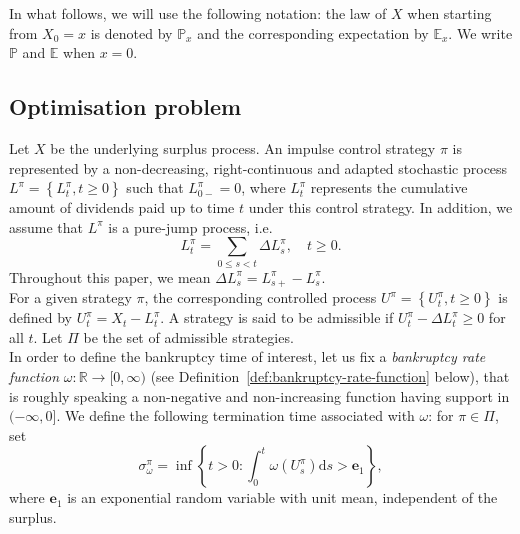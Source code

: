 \documentclass[10pt,a4paper]{amsart}
\newcommand{\p}{\mathbb{P}}
\newcommand{\e}{\mathbb{E}}
\newcommand{\reals}{\mathbb{R}}
\newcommand{\ruintime}{\sigma^\pi_\omega}
\renewcommand{\leq}{\leqslant}
\renewcommand{\geq}{\geqslant}
\begin{document}
In what follows, we will use the following notation: the law of $X$ when starting from $X_0 = x$ is denoted by $\p_x$ and the corresponding expectation by $\e_x$. We write $\p$ and $\e$ when $x=0$.


\subsection{Optimisation problem}\label{sect:optimisation-problem}

Let $X$ be the underlying surplus process. An impulse control strategy $\pi$ is represented by a non-decreasing, right-continuous and adapted stochastic process $L^\pi = \left\lbrace L^\pi_t , t \geq 0 \right\rbrace$ such that $L^\pi_{0-} = 0$, where $L^\pi_t$ represents the cumulative amount of dividends paid up to time $t$ under this control strategy. In addition, we assume that $L^\pi$ is a pure-jump process, i.e.
\[
L^\pi_t = \sum_{0 \leq s < t} \Delta L^\pi_s, \quad t \geq 0.
\]
Throughout this paper, we mean $\Delta L^\pi_s = L^\pi_{s+} - L^\pi_s$.\\
For a given strategy $\pi$, the corresponding controlled process $U^\pi = \left\lbrace U^\pi_t , t \geq 0 \right\rbrace$ is defined by $U^\pi_t = X_t - L^\pi_t$. A strategy is said to be admissible if $U^\pi_t - \Delta L^\pi_t \geq 0$ for all $t$. Let $\Pi$ be the set of admissible strategies.\\
In order to define the bankruptcy time of interest, let us fix a \textit{bankruptcy rate function} $\omega \colon \reals \to [0,\infty)$ (see Definition~\ref{def:bankruptcy-rate-function} below), that is roughly speaking a non-negative and non-increasing function having support in $(-\infty,0]$. We define the following termination time associated with $\omega$: for $\pi \in \Pi$, set
\begin{equation}\label{omega-ruin}
\ruintime = \inf \left\lbrace t>0 \colon \int_0^t \omega(U^\pi_s) \mathrm{d}s > \mathbf{e}_1 \right\rbrace ,
\end{equation}
where $\mathbf{e}_1$ is an exponential random variable with unit mean, independent of the surplus.
\end{document}
